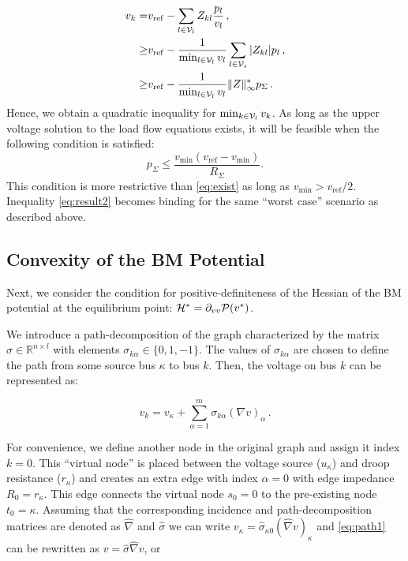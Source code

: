 \documentclass[letterpaper, 10 pt, conference]{ieeeconf}
\begin{document}
\begin{align}
    v_k =& v_{\mathrm{ref}} - \sum_{l\in {\cal V}_l} Z_{kl}\frac{p_l}{v_l} \nonumber\,, \\
    \geq & v_{\mathrm{ref}} -  \frac{1}{\min_{l \in {\cal V}_l} v_l}\sum_{l\in {\cal V}_s} |Z_{kl}| p_l \nonumber\,, \\
    \geq & v_{\mathrm{ref}} -  \frac{1}{\min_{l \in {\cal V}_l} v_l} \|Z\|_\infty^* p_\Sigma\,.
\end{align}
Hence, we obtain a quadratic inequality for $\min_{k\in{\cal V}_l} v_k$. As long as the upper voltage solution to the load flow equations exists, it will be feasible when the following condition is satisfied:
\begin{equation}\label{eq:result2}
	p_\Sigma \leq \frac{v_{\min}(v_{\mathrm{ref}} - v_{\min})}{R_\Sigma}.
\end{equation}
This condition is more restrictive than \eqref{eq:exist} as long as $v_{\min{}} > v_{\mathrm{ref}}/2$. Inequality \eqref{eq:result2} becomes binding for the same ``worst case'' scenario as described above.

\subsection{Convexity of the BM Potential}

Next, we consider the condition for positive-definiteness of the Hessian of the BM potential at the equilibrium point: ${\cal H}^* = \partial_{vv} {\cal P}(v^*)$. 

We introduce a path-decomposition of the graph characterized by the matrix $\sigma \in \mathbb{R}^{n\times l}$ with elements $\sigma_{k\alpha} \in \{0,1,-1\}$. The values of $\sigma_{k\alpha}$ are chosen to define the path from some source bus $\kappa$ to bus $k$. Then, the voltage on bus $k$ can be represented as:

\begin{equation}\label{eq:path1}
 v_k = v_\kappa + \sum_{\alpha=1}^m \sigma_{k\alpha} (\nabla v)_\alpha\,.
\end{equation}

For convenience, we define another node in the original graph and assign it index $k = 0$. This ``virtual node'' is placed between the voltage source ($u_\kappa$) and droop resistance ($r_\kappa$) and creates an extra edge with index $\alpha = 0$ with edge impedance $R_0 = r_\kappa$. This edge connects the virtual node $s_0 = 0$ to the pre-existing node $t_0 = \kappa$. Assuming that the corresponding incidence and path-decomposition matrices are denoted as $\hat{\nabla}$ and $\hat{\sigma}$ we can write $v_\kappa = \hat{\sigma}_{\kappa 0}(\hat\nabla v)_\kappa$ and \eqref{eq:path1} can be rewritten as $v = \hat\sigma \hat\nabla v$, or
\end{document}

